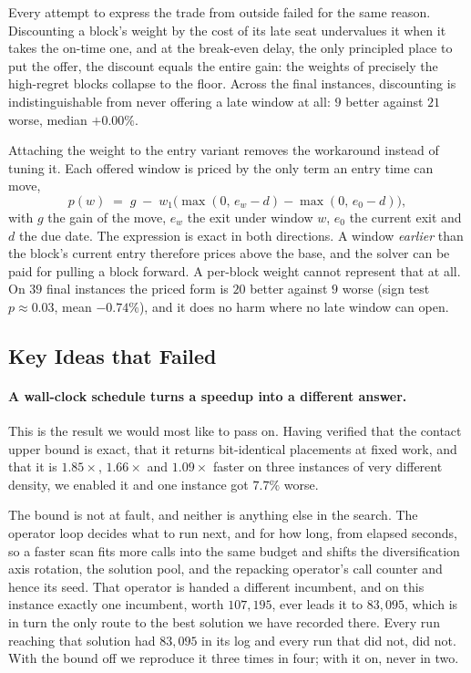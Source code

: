 \documentclass[runningheads]{llncs}
\begin{document}
Every attempt to express the trade from outside failed for the same reason. Discounting a block's
weight by the cost of its late seat undervalues it when it takes the on-time one, and at the
break-even delay, the only principled place to put the offer, the discount equals the entire gain:
the weights of precisely the high-regret blocks collapse to the floor. Across the final instances,
discounting is indistinguishable from never offering a late window at all: $9$ better against $21$
worse, median $+0.00\%$.

Attaching the weight to the entry variant removes the workaround instead of tuning it. Each offered
window is priced by the only term an entry time can move,
\begin{equation}
p(w) \;=\; g \;-\; w_1\bigl(\max(0,\,e_w - d) - \max(0,\,e_0 - d)\bigr),
\end{equation}
with $g$ the gain of the move, $e_w$ the exit under window $w$, $e_0$ the current exit and $d$ the
due date. The expression is exact in both directions. A window \emph{earlier} than the block's
current entry therefore prices above the base, and the solver can be paid for pulling a block
forward. A per-block weight cannot represent that at all. On $39$ final instances the priced form is
$20$ better against $9$ worse (sign test $p\approx0.03$, mean $-0.74\%$), and it does no harm where
no late window can open.

\subsection{Key Ideas that Failed}
\label{sec:failed}

\paragraph{A wall-clock schedule turns a speedup into a different answer.}
\label{sec:wallclock}
This is the result we would most like to pass on. Having verified that the contact upper bound is
exact, that it returns bit-identical placements at fixed work, and that it is $1.85\times$,
$1.66\times$ and $1.09\times$ faster on three instances of very different density, we enabled it
and one instance got $7.7\%$ worse.

The bound is not at fault, and neither is anything else in the search. The operator loop decides
what to run next, and for how long, from elapsed seconds, so a faster scan fits more calls into the
same budget and shifts the diversification axis rotation, the solution pool, and the repacking
operator's call counter and hence its seed. That operator is handed a different incumbent, and on
this instance exactly one incumbent, worth $107{,}195$, ever leads it to $83{,}095$, which is in
turn the only route to the best solution we have recorded there. Every run reaching that solution
had $83{,}095$ in its log and every run that did not, did not. With the bound off we reproduce it
three times in four; with it on, never in two.
\end{document}

